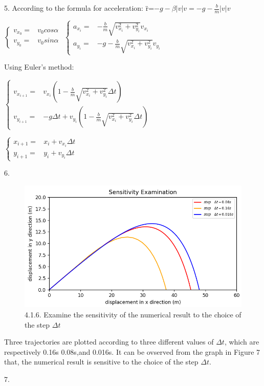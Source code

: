 \documentclass{book}
\begin{document}
\vspace{0.01\textheight}
{\Large 5.} According to the formula for acceleration: {\"r}=$-g-\beta |v|v=-g-\frac{b}{m}|v|v$

$\begin{cases}
    v_{x_{0}}= & v_{0}cos\alpha \\

    v_{y_{0}}= & v_{0}sin\alpha
  \end{cases}$
\quad $
  \begin{cases}
    a_{x_{i}}= & -\frac{b}{m} \sqrt{v_{x_{i}}^{2}+v_{y_{i}}^{2}}v_{x_{i}}   \\

    a_{y_{i}}= & -g-\frac{b}{m} \sqrt{v_{x_{i}}^{2}+v_{y_{i}}^{2}}v_{y_{i}}
  \end{cases}
$

\vspace{0.01\textheight}
Using Euler's method:
\vspace{0.01\textheight}

$\begin{cases}
    v_{x_{i+1}}= & v_{x_{i}}(1-\frac{b}{m}\sqrt{v_{x_{i}}^{2}+v_{y_{i}}^{2}}\Delta t)            \\

    v_{y_{i+1}}= & -g\Delta t+v_{y_{i}}(1-\frac{b}{m}\sqrt{v_{x_{i}}^{2}+v_{y_{i}}^{2}}\Delta t)
  \end{cases}$

\vspace{0.006\textheight}
$
  \begin{cases}
    x_{i+1}= & x_{i}+v_{x_{i}}\Delta t \\

    y_{i+1}= & y_{i}+v_{y_{i}}\Delta t
  \end{cases}
$

\newpage
{\Large 6.}
\begin{figure}[H]
  \centering
  \includegraphics[scale=0.5]{project4.1.6.png}
  \caption{4.1.6. Examine the sensitivity of the numerical result to the choice of the step $\Delta t$}
\end{figure}
Three trajectories are plotted according to three different values of {$\Delta t$}, which are respectively 0.16s 0.08s,and 0.016s.
It can be ovserved from the graph in Figure 7 that, the numerical result is sensitive to the choice of the step {$\Delta t$}.

{\Large 7.}
\end{document}
